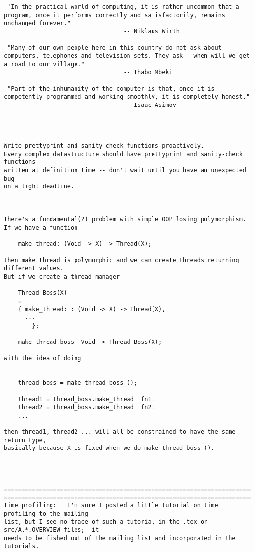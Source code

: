 \begin{verbatim}
 'In the practical world of computing, it is rather uncommon that a program, once it performs correctly and satisfactorily, remains unchanged forever."
                                  -- Niklaus Wirth 

 "Many of our own people here in this country do not ask about computers, telephones and television sets. They ask - when will we get a road to our village."
                                  -- Thabo Mbeki 

 "Part of the inhumanity of the computer is that, once it is competently programmed and working smoothly, it is completely honest."
                                  -- Isaac Asimov 




Write prettyprint and sanity-check functions proactively.
Every complex datastructure should have prettyprint and sanity-check functions
written at definition time -- don't wait until you have an unexpected bug
on a tight deadline.



There's a fundamental(?) problem with simple OOP losing polymorphism.
If we have a function

    make_thread: (Void -> X) -> Thread(X);

then make_thread is polymorphic and we can create threads returning different values.
But if we create a thread manager

    Thread_Boss(X)
	=
	{ make_thread: : (Void -> X) -> Thread(X),
	  ...
        };

    make_thread_boss: Void -> Thread_Boss(X);

with the idea of doing

    
    thread_boss = make_thread_boss ();

    thread1 = thread_boss.make_thread  fn1;
    thread2 = thread_boss.make_thread  fn2;
    ...

then thread1, thread2 ... will all be constrained to have the same return type,
basically because X is fixed when we do make_thread_boss ().




====================================================================================
====================================================================================
Time profiling:   I'm sure I posted a little tutorial on time profiling to the mailing
list, but I see no trace of such a tutorial in the .tex or src/A.*.OVERVIEW files;  it
needs to be fished out of the mailing list and incorporated in the tutorials.




\end{verbatim}
